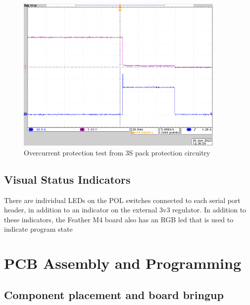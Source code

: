 \documentclass{article}
\begin{document}
\begin{figure}
\centering
\includegraphics[width=0.9\textwidth]{images/tek00006.png}
\caption{Overcurrent protection test from 3S pack protection circuitry}
\label{fig:3s-overcurrent}
\end{figure}


\subsection{Visual Status Indicators}
There are individual LEDs on the POL switches connected to each serial port header, in addition to an indicator on the external 3v3 regulator. In addition to these indicators, the Feather M4 board also has an RGB led that is used to indicate program state



\section{PCB Assembly and Programming}

\subsection{Component placement and board bringup}
\end{document}
